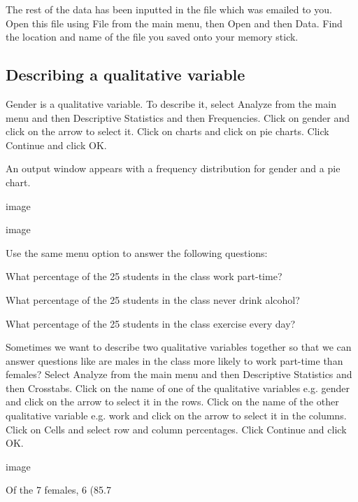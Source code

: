 The rest of the data has been inputted in the file which was emailed to you. Open this file using File from the main menu, then Open and then Data. 
Find the location and name of the file you saved onto your memory stick.
 
\subsection{Describing a qualitative variable}
 
Gender is a qualitative variable. To describe it, select Analyze from the main menu and then Descriptive Statistics and then Frequencies. 
Click on gender and click on the arrow to select it. Click on charts and click on pie charts. Click Continue and click OK.
 
An output window appears with a frequency distribution for gender and a pie chart.
 
 
 
image
 
image
 
 
 
 
Use the same menu option to answer the following questions:
 
What percentage of the 25 students in the class work part-time?
 
 
 
What percentage of the 25 students in the class never drink alcohol?
 
 
 
What percentage of the 25 students in the class exercise every day?
 
Sometimes we want to describe two qualitative variables together so that we can answer questions like are males in the class more likely to work part-time than females? 
Select Analyze from the main menu and then Descriptive Statistics and then Crosstabs. 
Click on the name of one of the qualitative variables e.g. gender and click on the arrow to select it in the rows. 
Click on the name of the other qualitative variable e.g. work and click on the arrow to select it in the columns. Click on Cells and select row and column percentages. Click Continue and click OK.
 
image
 
Of the 7 females, 6 (85.7%
 
